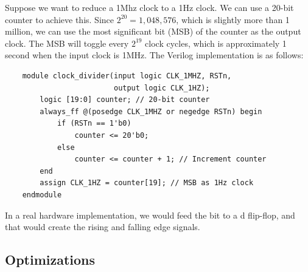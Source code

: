 \documentclass[11pt]{report}
\begin{document}
\begin{example}
    Suppose we want to reduce a 1Mhz clock to a 1Hz clock. We can use a 20-bit counter to achieve this. Since $2^{20} = 1,048,576$, which is slightly more than 1 million, we can use the most significant bit (MSB) of the counter as the output clock. The MSB will toggle every $2^{19}$ clock cycles, which is approximately 1 second when the input clock is 1MHz. The Verilog implementation is as follows:
    \begin{verbatim}
    module clock_divider(input logic CLK_1MHZ, RSTn,
                         output logic CLK_1HZ);
        logic [19:0] counter; // 20-bit counter     
        always_ff @(posedge CLK_1MHZ or negedge RSTn) begin
            if (RSTn == 1'b0)
                counter <= 20'b0;
            else
                counter <= counter + 1; // Increment counter
        end
        assign CLK_1HZ = counter[19]; // MSB as 1Hz clock
    endmodule
    \end{verbatim}

    In a real hardware implementation, we would feed the bit to a d flip-flop, and that would create the rising and falling edge signals.
\end{example}

\subsection{Optimizations}
\end{document}
